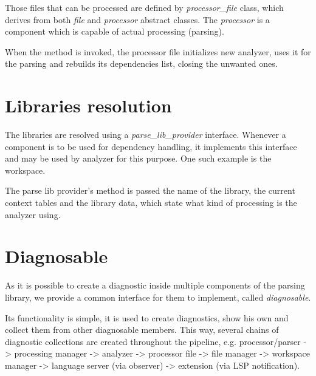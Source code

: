 Those files that can be processed are defined by \emph{processor\_file} class, which derives from both \emph{file} and \emph{processor} abstract classes. The \emph{processor} is a component which is capable of actual processing (parsing).

When the  method is invoked, the processor file initializes new analyzer, uses it for the parsing and rebuilds its dependencies list, closing the unwanted ones.


\section{Libraries resolution}

The libraries are resolved using a \emph{parse\_lib\_provider} interface. Whenever a component is to be used for dependency handling, it implements this interface and may be used by analyzer for this purpose. One such example is the workspace.

The parse lib provider's  method is passed the name of the library, the current context tables and the library data, which state what kind of processing is the analyzer using.

\section{Diagnosable}

As it is possible to create a diagnostic inside multiple components of the parsing library, we provide a common interface for them to implement, called \emph{diagnosable}.

Its functionality is simple, it is used to create diagnostics, show his own and collect them from other diagnosable members. This way, several chains of diagnostic collections are created throughout the pipeline, e.g. processor/parser -> processing manager -> analyzer -> processor file -> file manager -> workspace manager -> language server (via observer) -> extension (via LSP notification).

 